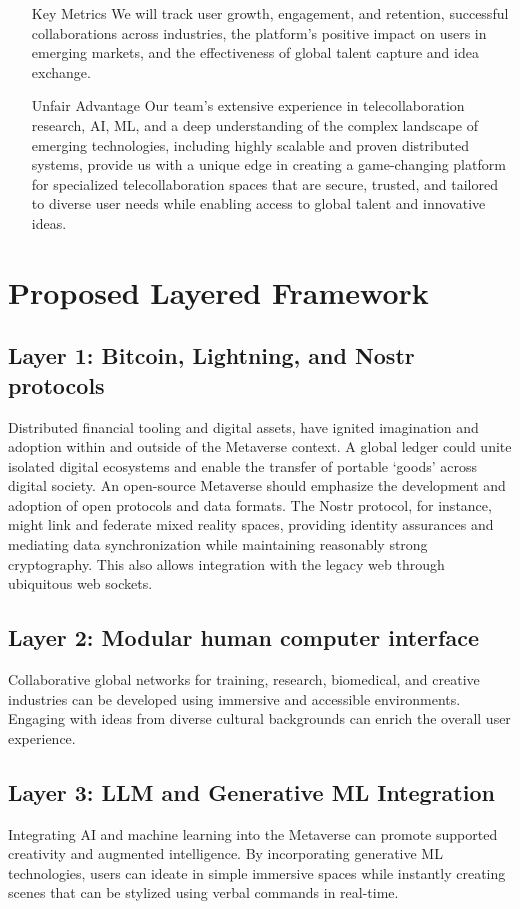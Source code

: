 \begin{itemize}
\item [Key Metrics] We will track user growth, engagement, and retention, successful collaborations across industries, the platform's positive impact on users in emerging markets, and the effectiveness of global talent capture and idea exchange.
\item [Unfair Advantage] Our team's extensive experience in telecollaboration research, AI, ML, and a deep understanding of the complex landscape of emerging technologies, including highly scalable and proven distributed systems, provide us with a unique edge in creating a game-changing platform for specialized telecollaboration spaces that are secure, trusted, and tailored to diverse user needs while enabling access to global talent and innovative ideas.
\end{itemize}
\section{Proposed Layered Framework}
\subsection{Layer 1: Bitcoin, Lightning, and Nostr protocols}
Distributed financial tooling and digital assets, have ignited imagination and adoption within and outside of the Metaverse context. A global ledger could unite isolated digital ecosystems and enable the transfer of portable `goods' across digital society. An open-source Metaverse should emphasize the development and adoption of open protocols and data formats. The Nostr protocol, for instance, might link and federate mixed reality spaces, providing identity assurances and mediating data synchronization while maintaining reasonably strong cryptography. This also allows integration with the legacy web through ubiquitous web sockets.
\subsection{Layer 2: Modular human computer interface}
Collaborative global networks for training, research, biomedical, and creative industries can be developed using immersive and accessible environments. Engaging with ideas from diverse cultural backgrounds can enrich the overall user experience.
\subsection{Layer 3: LLM and Generative ML Integration}
Integrating AI and machine learning into the Metaverse can promote supported creativity and augmented intelligence. By incorporating generative ML technologies, users can ideate in simple immersive spaces while instantly creating scenes that can be stylized using verbal commands in real-time.
